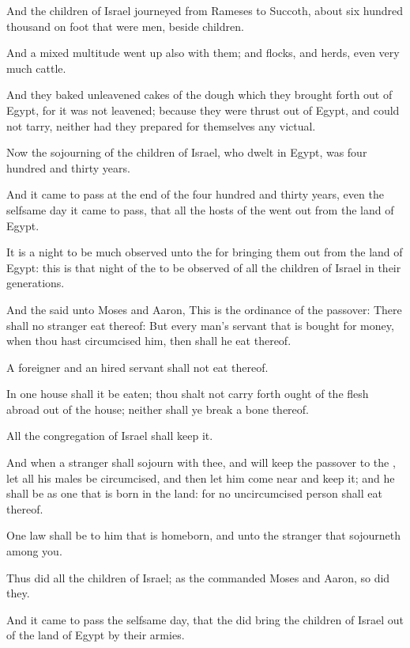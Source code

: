 \verse And the children of Israel journeyed from Rameses to Succoth, about six hundred thousand on foot that were men, beside children.

\verse And a mixed multitude went up also with them; and flocks, and herds, even very much cattle.

\verse And they baked unleavened cakes of the dough which they brought forth out of Egypt, for it was not leavened; because they were thrust out of Egypt, and could not tarry, neither had they prepared for themselves any victual.

\verse Now the sojourning of the children of Israel, who dwelt in Egypt, was four hundred and thirty years.

\verse And it came to pass at the end of the four hundred and thirty years, even the selfsame day it came to pass, that all the hosts of the \LORD went out from the land of Egypt.

\verse It is a night to be much observed unto the \LORD for bringing them out from the land of Egypt: this is that night of the \LORD to be observed of all the children of Israel in their generations.

\verse And the \LORD said unto Moses and Aaron, This is the ordinance of the passover: There shall no stranger eat thereof: \verse But every man's servant that is bought for money, when thou hast circumcised him, then shall he eat thereof.

\verse A foreigner and an hired servant shall not eat thereof.

\verse In one house shall it be eaten; thou shalt not carry forth ought of the flesh abroad out of the house; neither shall ye break a bone thereof.

\verse All the congregation of Israel shall keep it.

\verse And when a stranger shall sojourn with thee, and will keep the passover to the \LORD, let all his males be circumcised, and then let him come near and keep it; and he shall be as one that is born in the land: for no uncircumcised person shall eat thereof.

\verse One law shall be to him that is homeborn, and unto the stranger that sojourneth among you.

\verse Thus did all the children of Israel; as the \LORD commanded Moses and Aaron, so did they.

\verse And it came to pass the selfsame day, that the \LORD did bring the children of Israel out of the land of Egypt by their armies.

